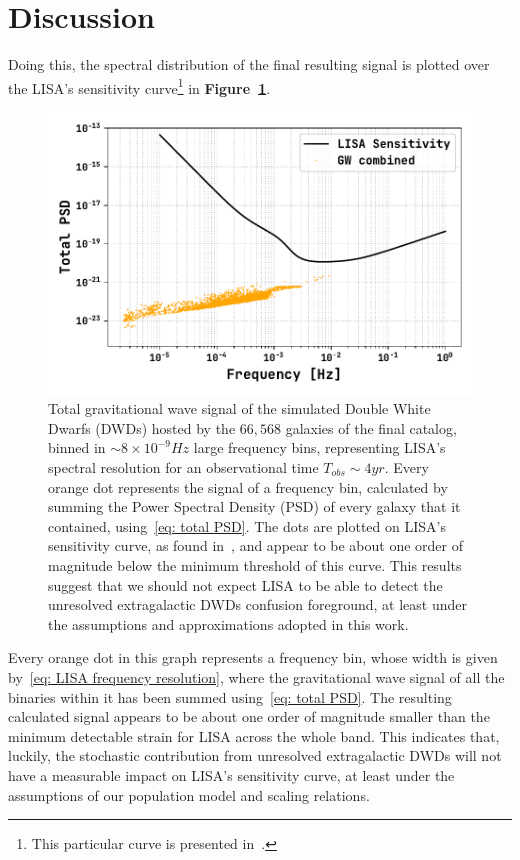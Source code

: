 \section{Discussion}

Doing this, the spectral distribution of the final resulting signal is plotted over the LISA's sensitivity curve\footnote{This particular curve is presented in~\cite{Robson_2019}.} in \textbf{Figure~\ref{fig: Final results plot}}.
\begin{figure}[ht!]
    \begin{center}
        \includegraphics[width=\textwidth]{images/Final_results_plot.pdf}
    \end{center}
    \caption{Total gravitational wave signal of the simulated Double White Dwarfs (DWDs) hosted by the $66,568$ galaxies of the final catalog, binned in $\sim 8\times10^{-9}Hz$ large frequency bins, representing LISA's spectral resolution for an observational time $T_{obs}\sim4yr$. 
    Every orange dot represents the signal of a frequency bin, calculated by summing the Power Spectral Density (PSD) of every galaxy that it contained, using~\eqref{eq: total PSD}. 
    The dots are plotted on LISA's sensitivity curve, as found in~\cite{Robson_2019}, and appear to be about one order of magnitude below the minimum threshold of this curve.
    This results suggest that we should not expect LISA to be able to detect the unresolved extragalactic DWDs confusion foreground, at least under the assumptions and approximations adopted in this work.}\label{fig: Final results plot}
\end{figure}
Every orange dot in this graph represents a frequency bin, whose width is given by~\eqref{eq: LISA frequency resolution}, where the gravitational wave signal of all the binaries within it has been summed using~\eqref{eq: total PSD}.
The resulting calculated signal appears to be about one order of magnitude smaller than the minimum detectable strain for LISA across the whole band.  
This indicates that, luckily, the stochastic contribution from unresolved extragalactic DWDs will not have a measurable impact on LISA’s sensitivity curve, at least under the assumptions of our population model and scaling relations. 

